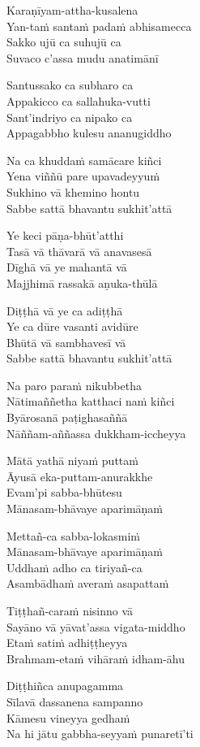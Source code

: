\begin{paritta}
Karaṇīyam-attha-kusalena\\
Yan-taṁ santaṁ padaṁ abhisamecca\\
Sakko ujū ca suhujū ca\\
Suvaco c'assa mudu anatimānī

Santussako ca subharo ca\\
Appakicco ca sallahuka-vutti\\
Sant'indriyo ca nipako ca\\
Appagabbho kulesu ananugiddho

Na ca khuddaṁ samācare kiñci\\
Yena viññū pare upavadeyyuṁ\\
Sukhino vā khemino hontu\\
Sabbe sattā bhavantu sukhit'attā

Ye keci pāṇa-bhūt'atthi\\
Tasā vā thāvarā vā anavasesā\\
Dīghā vā ye mahantā vā\\
Majjhimā rassakā aṇuka-thūlā

Diṭṭhā vā ye ca adiṭṭhā\\
Ye ca dūre vasanti avidūre\\
Bhūtā vā sambhavesī vā\\
Sabbe sattā bhavantu sukhit'attā

Na paro paraṁ nikubbetha\\
Nātimaññetha katthaci naṁ kiñci\\
Byārosanā paṭighasaññā\\
Nāññam-aññassa dukkham-iccheyya

Mātā yathā niyaṁ puttaṁ\\
Āyusā eka-puttam-anurakkhe\\
Evam'pi sabba-bhūtesu\\
Mānasam-bhāvaye aparimāṇaṁ

Mettañ-ca sabba-lokasmiṁ\\
Mānasam-bhāvaye aparimāṇaṁ\\
Uddhaṁ adho ca tiriyañ-ca\\
Asambādhaṁ averaṁ asapattaṁ

Tiṭṭhañ-caraṁ nisinno vā\\
Sayāno vā yāvat'assa vigata-middho\\
Etaṁ satiṁ adhiṭṭheyya\\
Brahmam-etaṁ vihāraṁ idham-āhu

Diṭṭhiñca anupagamma\\
Sīlavā dassanena sampanno\\
Kāmesu vineyya gedhaṁ\\
Na hi jātu gabbha-seyyaṁ punaretī'ti


\end{paritta}

